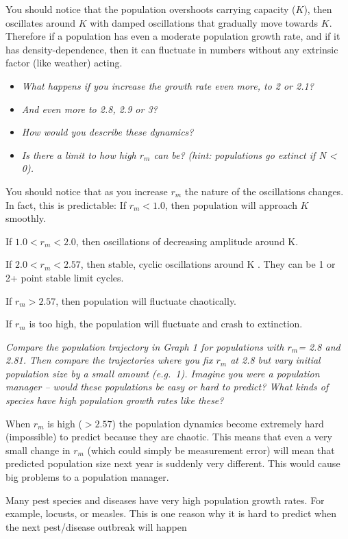\documentclass[
  a4paper]{book}
\providecommand{\tightlist}{%
  \setlength{\itemsep}{0pt}\setlength{\parskip}{0pt}}
\begin{document}
You should notice that the population overshoots carrying capacity (\(K\)), then oscillates around \(K\) with damped oscillations that gradually move towards \(K\). Therefore if a population has even a moderate population growth rate, and if it has density-dependence, then it can fluctuate in numbers without any extrinsic factor (like weather) acting.

\begin{itemize}
\tightlist
\item
  \emph{What happens if you increase the growth rate even more, to 2 or 2.1?}
\item
  \emph{And even more to 2.8, 2.9 or 3?}
\item
  \emph{How would you describe these dynamics?}
\item
  \emph{Is there a limit to how high \(r_m\) can be? (hint: populations go extinct if N \textless{} 0).}
\end{itemize}

You should notice that as you increase \(r_m\) the nature of the oscillations changes. In fact, this is predictable: If \(r_m < 1.0\), then population will approach \(K\) smoothly.

If \(1.0 < r_m < 2.0\), then oscillations of decreasing amplitude around K.

If \(2.0< r_m < 2.57\), then stable, cyclic oscillations around K . They can be 1 or 2+ point stable limit cycles.

If \(r_m > 2.57\), then population will fluctuate chaotically.

If \(r_m\) is too high, the population will fluctuate and crash to extinction.

\emph{Compare the population trajectory in Graph 1 for populations with \(r_m\)= 2.8 and 2.81. Then compare the trajectories where you fix \(r_m\) at 2.8 but vary initial population size by a small amount (e.g.~1). Imagine you were a population manager -- would these populations be easy or hard to predict? What kinds of species have high population growth rates like these?}

When \(r_m\) is high (\(>2.57\)) the population dynamics become extremely hard (impossible) to predict because they are chaotic. This means that even a very small change in \(r_m\) (which could simply be measurement error) will mean that predicted population size next year is suddenly very different. This would cause big problems to a population manager.

Many pest species and diseases have very high population growth rates. For example, locusts, or measles. This is one reason why it is hard to predict when the next pest/disease outbreak will happen
\end{document}
